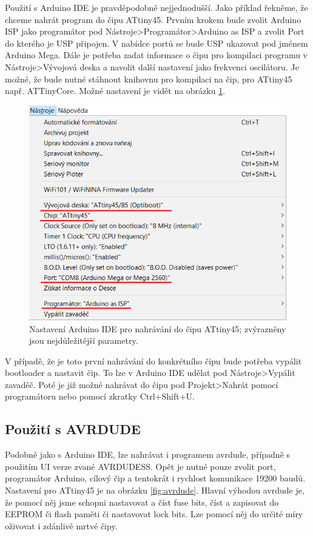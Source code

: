 \documentclass[11pt,a4paper,twoside,openright]{report}
\begin{document}
Použití s Arduino IDE je pravděpodobně nejjednodušší. Jako příklad řekněme, že chceme nahrát program do čipu ATtiny45. Prvním krokem bude zvolit Arduino ISP jako programátor pod Nástroje>Programátor>Arduino as ISP a zvolit Port do kterého je USP připojen. V nabídce portů se bude USP ukazovat pod jménem Arduino Mega. Dále je potřeba zadat informace o čipu pro kompilaci programu v Nástroje>Vývojová deska a navolit další nastavení jako frekvenci oscilátoru. Je možné, že bude nutné stáhnout knihovnu pro kompilaci na čip, pro ATtiny45 např. ATTinyCore.\cite{attinycore} Možné nastavení je vidět na obrázku \ref{fig:settings}.

\begin{figure}[ht!]
  \includegraphics[width=0.75\linewidth]{img/settings.png}
  \centering
  \caption{Nastavení Arduino IDE pro nahrávání do čipu ATtiny45; zvýrazněny jsou nejdůležitější parametry.}
  \label{fig:settings}
\end{figure}

V případě, že je toto první nahrávání do konkrétního čipu bude potřeba vypálit bootloader a nastavit čip. To lze v Arduino IDE udělat pod Nástroje>Vypálit zavaděč. Poté je již možné nahrávat do čipu pod Projekt>Nahrát pomocí programátoru nebo pomocí zkratky Ctrl+Shift+U.

\subsection {Použití s AVRDUDE}

Podobně jako s Arduino IDE, lze nahrávat i programem avrdude, případně s použitím UI verze zvané AVRDUDESS. Opět je nutné pouze zvolit port, programátor Arduino, cílový čip a tentokrát i rychlost komunikace 19200 baudů. Nastavení pro ATtiny45 je na obrázku \ref{fig:avrdude}. Hlavní výhodou avrdude je, že pomocí něj jsme schopni nastavovat a číst fuse bits, číst a zapisovat do EEPROM či flash paměti či nastavovat lock bits. Lze pomocí něj do určité míry oživovat i zdánlivě mrtvé čipy.
\end{document}
